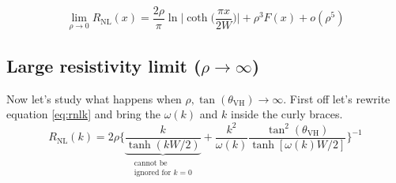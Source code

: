 \begin{equation}
    \lim_{\rho\to 0} R_{\textrm{NL}}(x)=
    \frac{2\rho}\pi\ln\bigg |\coth \Big(\frac{\pi x}{2W}\Big)\bigg | +
    \rho^3F(x) +
    o(\rho^5)
    \label{eq:lowrho}
\end{equation}




















\subsection{Large resistivity limit ($\rho\to \infty$)}
\label{sec:highrho}
Now let's study what happens when $\rho,\tan(\theta_{\textrm{VH}})\to \infty$. First off let's rewrite equation \ref{eq:rnlk} and bring the $\omega(k)$ and $k$ inside the curly braces.
\begin{equation}
        R_{\textrm{NL}}(k)=2\rho
    \bigg\{
        \underbrace{\frac{k}{\tanh(kW/2)}}_{\substack{\text{cannot be}\\\text{ignored for } k=0}} + \frac {k^2}{\omega(k)}\frac{\tan^2(\theta_{\textrm{VH}})}{\tanh[\omega(k)W/2]}    
    \bigg\}^{-1}
    \label{eq:rhoinf1}
\end{equation}


